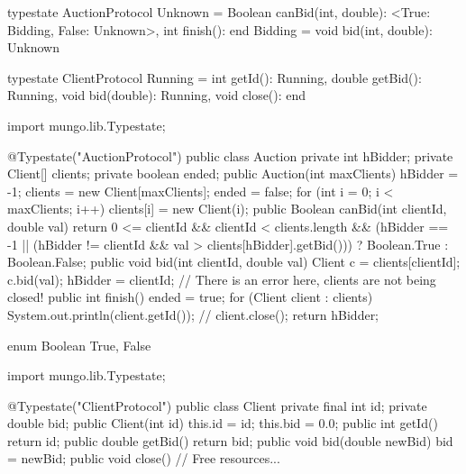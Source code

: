\begin{code}
typestate AuctionProtocol {
  Unknown = {
    Boolean canBid(int, double): <True: Bidding, False: Unknown>,
    int finish(): end
  }
  Bidding = {
    void bid(int, double): Unknown
  }
}\end{code}

\begin{code}
typestate ClientProtocol {
  Running = {
    int getId(): Running,
    double getBid(): Running,
    void bid(double): Running,
    void close(): end
  }
}\end{code}

\begin{code}
import mungo.lib.Typestate;

@Typestate("AuctionProtocol")
public class Auction {
  private int hBidder;
  private Client[] clients;
  private boolean ended;
  public Auction(int maxClients) {
    hBidder = -1;
    clients = new Client[maxClients];
    ended = false;
    for (int i = 0; i < maxClients; i++)
      clients[i] = new Client(i);
  }
  public Boolean canBid(int clientId, double val) {
    return 0 <= clientId && clientId < clients.length &&
           (hBidder == -1 ||
           (hBidder != clientId && val > clients[hBidder].getBid())) ?
              Boolean.True :
              Boolean.False;
  }
  public void bid(int clientId, double val) {
    Client c = clients[clientId];
    c.bid(val);
    hBidder = clientId;
  }
  // There is an error here, clients are not being closed!
  public int finish() {
    ended = true;
    for (Client client : clients) {
      System.out.println(client.getId());
      // client.close();
    }
    return hBidder;
  }
}\end{code}

\begin{code}
enum Boolean {
  True, False
}\end{code}

\begin{code}
import mungo.lib.Typestate;

@Typestate("ClientProtocol")
public class Client {
  private final int id;
	private double bid;
	public Client(int id) {
    this.id = id;
		this.bid = 0.0;
	}
  public int getId() {
    return id;
  }
  public double getBid() {
    return bid;
  }
	public void bid(double newBid) {
    bid = newBid;
  }
  public void close() {
    // Free resources...
  }
}\end{code}

